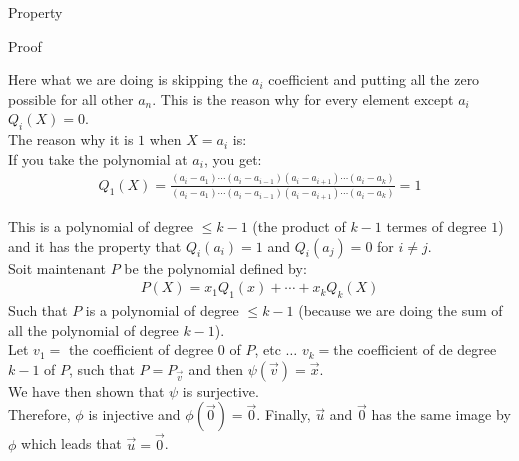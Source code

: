 \begin{parag}{Property}
\begin{subparag}{Proof}
\begin{framedremark}
        Here what we are doing is skipping the $a_i$ coefficient and putting all the zero possible for all other $a_n$. This is the reason why for every element except $a_i$ $Q_i\left(X\right) = 0$.\\
        The reason why it is $1$ when $X = a_i$ is:\\
        If you take the polynomial at $a_i$, you get:
        \begin{align*} 
            Q_1\left(X\right) =  \frac{\left(a_i-a_1\right)\cdots\left(a_i-a_{i-1}\right)\left(a_i -a_{i+1}\right)\cdots\left(a_i-a_k\right)}{\left(a_i - a_1\right)\cdots\left(a_i - a_{i-1}\right)\left(a_i-a_{i+1}\right)\cdots\left(a_i-a_k\right)} = 1
        \end{align*}
        \end{framedremark}
        This is a polynomial of degree $\leq k-1$ (the product of $k-1$ termes of degree $1$) and it has the property that $Q_i\left(a_i\right)= 1$ and $Q_i\left(a_j\right) = 0$ for $i \neq j$.\\
        Soit maintenant $P$ be the polynomial defined by:
        \begin{align*} 
            P\left(X\right) = x_1Q_1\left(x\right) + \cdots + x_kQ_k\left(X\right)
        \end{align*}
        Such that $P$ is a polynomial of degree $\leq k-1$ (because we are doing the sum of all the polynomial of degree $k-1$).\\
        Let $v_1 = $ the coefficient of degree $0$ of $P$, etc $\ldots$ $v_k = $the coefficient of de degree $k-1$ of $P$, such that $P = P_{\vec{v}}$ and then $\psi\left(\vec{v}\right) =  \vec{x}$.\\
        We have then shown that $\psi$ is surjective.\\
        Therefore, $\phi$ is injective and $\phi\left(\vec{0}\right) = \vec{0}$. Finally, $\vec{u}$ and $\vec{0}$ has the same image by $\phi$ which leads that $\vec{u} =  \vec{0}$.
    \end{subparag}
\end{parag}



